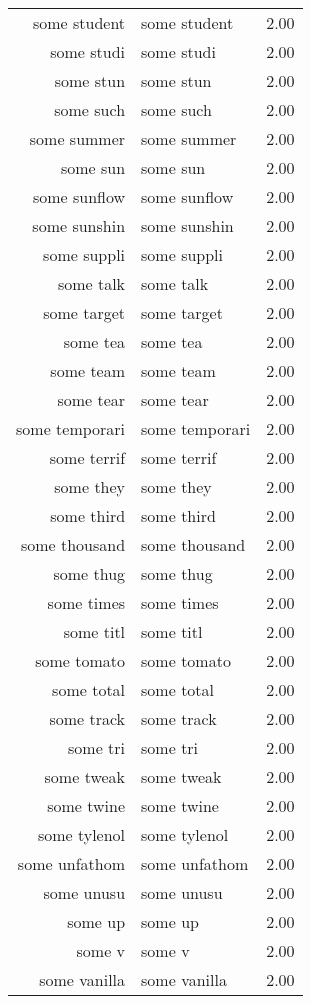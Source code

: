 \begin{table}[ht]
\begin{tabular}{rlr}
  some student & some student & 2.00 \\ 
  some studi & some studi & 2.00 \\ 
  some stun & some stun & 2.00 \\ 
  some such & some such & 2.00 \\ 
  some summer & some summer & 2.00 \\ 
  some sun & some sun & 2.00 \\ 
  some sunflow & some sunflow & 2.00 \\ 
  some sunshin & some sunshin & 2.00 \\ 
  some suppli & some suppli & 2.00 \\ 
  some talk & some talk & 2.00 \\ 
  some target & some target & 2.00 \\ 
  some tea & some tea & 2.00 \\ 
  some team & some team & 2.00 \\ 
  some tear & some tear & 2.00 \\ 
  some temporari & some temporari & 2.00 \\ 
  some terrif & some terrif & 2.00 \\ 
  some they & some they & 2.00 \\ 
  some third & some third & 2.00 \\ 
  some thousand & some thousand & 2.00 \\ 
  some thug & some thug & 2.00 \\ 
  some times & some times & 2.00 \\ 
  some titl & some titl & 2.00 \\ 
  some tomato & some tomato & 2.00 \\ 
  some total & some total & 2.00 \\ 
  some track & some track & 2.00 \\ 
  some tri & some tri & 2.00 \\ 
  some tweak & some tweak & 2.00 \\ 
  some twine & some twine & 2.00 \\ 
  some tylenol & some tylenol & 2.00 \\ 
  some unfathom & some unfathom & 2.00 \\ 
  some unusu & some unusu & 2.00 \\ 
  some up & some up & 2.00 \\ 
  some v & some v & 2.00 \\ 
  some vanilla & some vanilla & 2.00 \\ 

\end{tabular}
\end{table}
